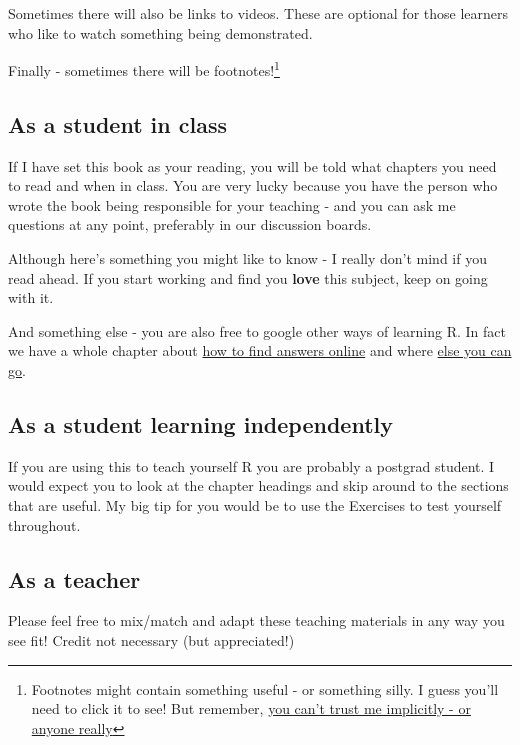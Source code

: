 \documentclass[
]{book}
\begin{document}
Sometimes there will also be links to videos. These are optional for those learners who like to watch something being demonstrated.

Finally - sometimes there will be footnotes!\footnote{Footnotes might contain something useful - or something silly. I guess you'll need to click it to see! But remember, \href{https://youtu.be/UaGTFeibOEk}{you can't trust me implicitly - or anyone really}}

\hypertarget{useinclass}{%
\subsection{As a student in class}\label{useinclass}}

If I have set this book as your reading, you will be told what chapters you need to read and when in class. You are very lucky because you have the person who wrote the book being responsible for your teaching - and you can ask me questions at any point, preferably in our discussion boards.

Although here's something you might like to know - I really don't mind if you read ahead. If you start working and find you \textbf{love} this subject, keep on going with it.

And something else - you are also free to google other ways of learning R. In fact we have a whole chapter about \protect\hyperlink{trouble}{how to find answers online} and where \protect\hyperlink{whatnext}{else you can go}.

\hypertarget{useindependent}{%
\subsection{As a student learning independently}\label{useindependent}}

If you are using this to teach yourself R you are probably a postgrad student. I would expect you to look at the chapter headings and skip around to the sections that are useful. My big tip for you would be to use the Exercises to test yourself throughout.

\hypertarget{useteach}{%
\subsection{As a teacher}\label{useteach}}

Please feel free to mix/match and adapt these teaching materials in any way you see fit! Credit not necessary (but appreciated!)
\end{document}
